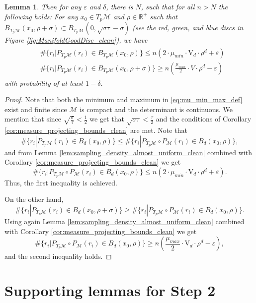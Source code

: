 \documentclass[12pt]{article}
\newtheorem{Lemma}[Theorem]{Lemma}
\theoremstyle{remark}
\newcommand{\RR}{\mathbb{R}}
\newcommand{\MM}{\mathcal{M}}
\newcommand{\eps}{\varepsilon}
\newcommand{\emphbrackets}[1]{\emph{(}#1\emph{)}}
\begin{document}
\begin{appendices}
\begin{Lemma}
    Then for any $\eps$ and $\delta$, there is $N$, such that for all $n>N$ the following holds: For any $x_0\in T_p\MM$ and $\rho \in \RR^+$ such that $B_{T_p\MM}(x_0,\rho + \sigma)\subset  B_{T_p\MM}(0,\sqrt{\sigma\tau}- \sigma)$ \emphbrackets{see the red, green, and blue discs in Figure \ref{fig:ManifoldGoodDisc_clean}}, we have 
\begin{align*}
\begin{split}
&\#\{r_i|P_{T_p\MM}(r_i) \in B_{T_p\MM}(x_0,\rho) \}
\leq
n(2\cdot \mu_{min}\cdot \mathrm{V}_d \cdot\rho^d+\eps) \\
&\#\{r_i|P_{T_p\MM}(r_i) \in B_{T_p\MM}(x_0,\rho+\sigma) \}
\geq
n \left(\frac{\mu_{max}}{2}\cdot V \cdot \rho^d - \eps\right)
\end{split}
\end{align*}
with probability of at least $1-\delta$.
\end{Lemma}


\begin{proof}
    Note that both the minimum and maximum in \eqref{eq:mu_min_max_def} exist and finite since $ \MM $ is compact and the determinant is continuous.
	We mention that since $ \sqrt{\frac{\sigma}{\tau}} < \frac{1}{2} $ we get that $ \sqrt{\sigma \tau} < \frac{\tau}{2} $ and the conditions of Corollary \ref{cor:measure_projecting_bounds_clean} are met.
	Note that 
	\[
	\#\{r_i|P_{T_p\MM}(r_i) \in B_d(x_0,\rho) \} \leq \#\{r_i|P_{T_p\MM}\circ P_\MM(r_i) \in B_d(x_0,\rho) \}
	,\]
	and from Lemma \ref{lem:sampling_density_almost_uniform_clean} combined with Corollary \ref{cor:measure_projecting_bounds_clean} we get
	\[
	\#\{r_i|P_{T_p\MM}\circ P_\MM(r_i) \in B_d(x_0,\rho) \} \leq n(2\cdot \mu_{min}\cdot \mathrm{V}_d \cdot\rho^d+\eps)
	.\]
	Thus, the first inequality is achieved.
	
	On the other hand,
	\[
	\#\{r_i|P_{T_p\MM}(r_i) \in B_d(x_0,\rho+\sigma) \}
	\geq \#\{r_i|P_{T_p\MM}\circ P_\MM(r_i) \in B_d(x_0,\rho)\}
	.\]
	Using again Lemma \ref{lem:sampling_density_almost_uniform_clean} combined with Corollary \ref{cor:measure_projecting_bounds_clean} we get
	\[
	\#\{r_i|P_{T_p\MM}\circ P_\MM(r_i) \in B_d(x_0,\rho)\} \geq n \left(\frac{\mu_{max}}{2}\cdot \mathrm{V}_{d} \cdot \rho^d - \eps\right)
	,\]
	and the second inequality holds.
\end{proof}


\section{Supporting lemmas for Step 2}



\end{appendices}
\end{document}
